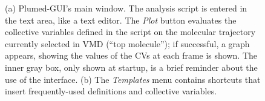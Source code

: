 \documentclass[preprint,review,11pt]{elsarticle}
\begin{document}
\begin{figure}
  \centering
  \caption{(a) Plumed-GUI's main window.  The analysis script is
    entered in the text area, like a text editor. The \emph{Plot}
    button evaluates the collective variables defined in the script on
    the molecular trajectory currently selected in VMD (``top
    molecule''); if successful, a graph appears, showing the values of
    the CVs at each frame is shown. The inner gray box, only shown at
    startup, is a brief reminder about the use of the interface. (b)
    The \emph{Templates} menu contains shortcuts that insert
    frequently-used definitions and collective variables. }
\end{figure}
\end{document}
